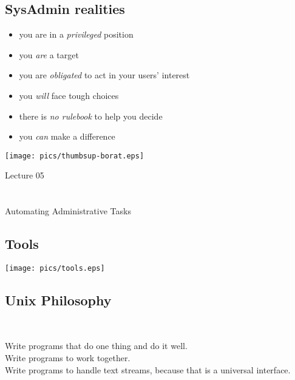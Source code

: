 \documentclass[xga]{xdvislides}
\begin{document}
\subsection{SysAdmin realities}
\begin{itemize}
	\item you are in a {\em privileged} position
	\item you {\em are} a target
	\item you are {\em obligated} to act in your users' interest
	\item you {\em will} face tough choices
	\item there is {\em no rulebook} to help you decide
	\item you {\em can} make a difference
\end{itemize}

\begin{center}
	\texttt{[image: pics/thumbsup-borat.eps]}
\end{center}

\newpage
\vspace*{\fill}
\begin{center}
    \Hugesize
        Lecture 05 \\ [1em]
    \hspace*{5mm}
    \blueline\\
    \hspace*{5mm}\\
	Automating Administrative Tasks
\end{center}
\vspace*{\fill}

\subsection{Tools}
\vspace*{\fill}
\begin{center}
	\texttt{[image: pics/tools.eps]}
\end{center}
\vspace*{\fill}

\subsection{Unix Philosophy}
\\
\Huge
\begin{center}
	Write programs that do one thing and do it well.\\
	\vspace{.5in}
	Write programs to work together. \\
	\vspace{.5in}
	Write programs to handle text streams, because that is a universal interface.
\end{center}
\Normalsize
\end{document}
